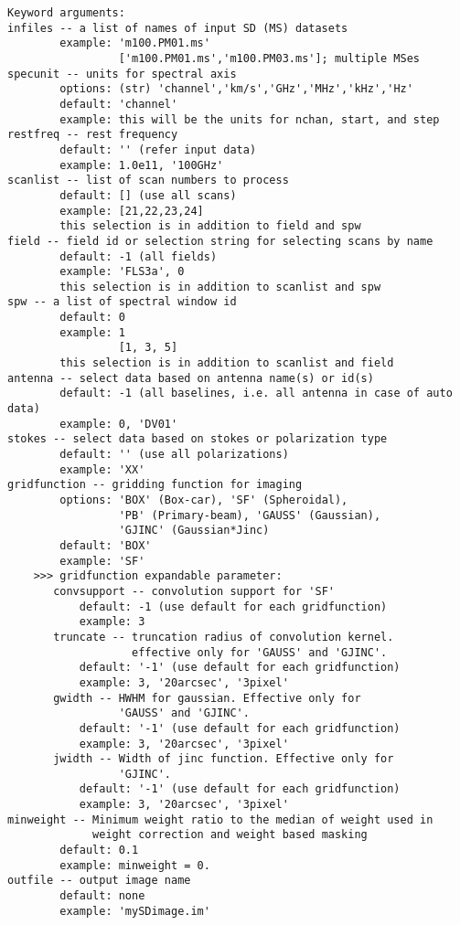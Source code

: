 \begin{verbatim}
Keyword arguments:
infiles -- a list of names of input SD (MS) datasets
        example: 'm100.PM01.ms'
                 ['m100.PM01.ms','m100.PM03.ms']; multiple MSes
specunit -- units for spectral axis
        options: (str) 'channel','km/s','GHz','MHz','kHz','Hz'
        default: 'channel'
        example: this will be the units for nchan, start, and step
restfreq -- rest frequency
        default: '' (refer input data)
        example: 1.0e11, '100GHz'
scanlist -- list of scan numbers to process
        default: [] (use all scans)
        example: [21,22,23,24]
        this selection is in addition to field and spw
field -- field id or selection string for selecting scans by name
        default: -1 (all fields)
        example: 'FLS3a', 0
        this selection is in addition to scanlist and spw
spw -- a list of spectral window id
        default: 0
        example: 1
                 [1, 3, 5]
        this selection is in addition to scanlist and field
antenna -- select data based on antenna name(s) or id(s)
        default: -1 (all baselines, i.e. all antenna in case of auto data)
        example: 0, 'DV01'
stokes -- select data based on stokes or polarization type 
        default: '' (use all polarizations)
        example: 'XX'
gridfunction -- gridding function for imaging
        options: 'BOX' (Box-car), 'SF' (Spheroidal), 
                 'PB' (Primary-beam), 'GAUSS' (Gaussian),
                 'GJINC' (Gaussian*Jinc)
        default: 'BOX'
        example: 'SF'
    >>> gridfunction expandable parameter:
       convsupport -- convolution support for 'SF' 
           default: -1 (use default for each gridfunction)
           example: 3
       truncate -- truncation radius of convolution kernel.
                   effective only for 'GAUSS' and 'GJINC'.
           default: '-1' (use default for each gridfunction)
           example: 3, '20arcsec', '3pixel'
       gwidth -- HWHM for gaussian. Effective only for 
                 'GAUSS' and 'GJINC'.
           default: '-1' (use default for each gridfunction)
           example: 3, '20arcsec', '3pixel'
       jwidth -- Width of jinc function. Effective only for 
                 'GJINC'.
           default: '-1' (use default for each gridfunction)
           example: 3, '20arcsec', '3pixel'
minweight -- Minimum weight ratio to the median of weight used in 
             weight correction and weight based masking
        default: 0.1
        example: minweight = 0.
outfile -- output image name
        default: none
        example: 'mySDimage.im'

\end{verbatim}
